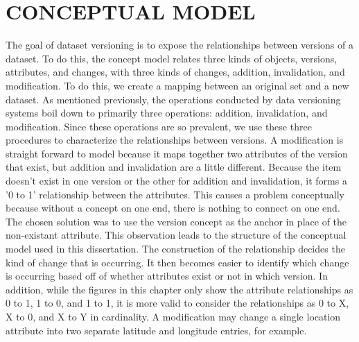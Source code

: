 
\chapter{CONCEPTUAL MODEL}\label{ch:model}

The goal of dataset versioning is to expose the relationships between versions of a dataset.
To do this, the concept model relates three kinds of objects, versions, attributes, and changes, with three kinds of changes, addition, invalidation, and modification.
To do this, we create a mapping between an original set and a new dataset.
As mentioned previously, the operations conducted by data versioning systems boil down to primarily three operations: addition, invalidation, and modification.
Since these operations are so prevalent, we use these three procedures to characterize the relationships between versions.
A modification is straight forward to model because it maps together two attributes of the version that exist, but addition and invalidation are a little different.
Because the item doesn't exist in one version or the other for addition and invalidation, it forms a '0 to 1' relationship between the attributes.
This causes a problem conceptually because without a concept on one end, there is nothing to connect on one end.
The chosen solution was to use the version concept as the anchor in place of the non-existant attribute.
This observation leads to the structure of the conceptual model used in this dissertation.
The construction of the relationship decides the kind of change that is occurring.
It then becomes easier to identify which change is occurring based off of whether attributes exist or not in which version.
In addition, while the figures in this chapter only show the attribute relationships as 0 to 1, 1 to 0, and 1 to 1, it is more valid to consider the relationships as 0 to X, X to 0, and X to Y in cardinality.
A modification may change a single location attribute into two separate latitude and longitude entries, for example.

